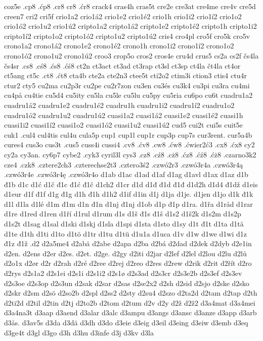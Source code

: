 coz5e
.cp8
.ćp8
.cr8
cr8
.ćr8
crack4
cras4h
cras5t
cre2e
cre3at
cre4me
cre4v
cre5d
creen7
cri2
cri5f
crio1a2
crio1á2
crio1e2
crio1é2
crio1h
crio1i2
crio1í2
crio1o2
crio1ó2
crio1u2
crio1ú2
cripto1a2
cripto1á2
cripto1e2
cripto1é2
cripto1h
cripto1i2
cripto1í2
cripto1o2
cripto1ó2
cripto1u2
cripto1ú2
cris4
cro4pl
cro5f
cro5k
cro5v
crono1a2
crono1á2
crono1e2
crono1é2
crono1h
crono1i2
crono1í2
crono1o2
crono1ó2
crono1u2
crono1ú2
croo3
crop5o
cros2
cros4e
cru4d
crus5
cs2a
cs2f
čs4la
čs4sr
.cs8
.cś8
.ćs8
.ćś8
ct2n
ct3act
ct3ad
ct3rap
ct3sl
ct3sp
ct4la
čt4la
ct4or
ct5ang
ct5c
.ct8
.ćt8
cta4b
cte2a
cte2n3
ctee5t
cti2o2
ctim3i
ction3
ctis4
ctu4r
ctur2
cty5
cu2ma
cu2p3r
cu2pe
cu2r7zon
cu3en
cu3és
cu3k4
cu3pi
cu3ra
cu4mi
cu4på
cu4tie
cu5d4
cu5ity
cu5la
cu5le
cu5lu
cu5py
cu5ria
cu6po
cu6t
cuadru1a2
cuadru1á2
cuadru1e2
cuadru1é2
cuadru1h
cuadru1i2
cuadru1í2
cuadru1o2
cuadru1ó2
cuadru1u2
cuadru1ú2
cuasi1a2
cuasi1á2
cuasi1e2
cuasi1é2
cuasi1h
cuasi1i2
cuasi1í2
cuasi1o2
cuasi1ó2
cuasi1u2
cuasi1ú2
cud5
cui2t
cui5s
cuit5e
cuk1
.cul4
cul4tis
cul4u
cula5p
cup1
cup1l
cup1r
cup3p
cup7s
cur3rent.
cur5a4b
cures4
cus3o
cus3t
.cus5
cuss4i
cussi4
.cv8
.ćv8
.cw8
.ćw8
.ćwier2ć3
.cx8
.ćx8
cy2
cy2a
cy3an.
cy6p7
cybe2
.cyk3
cyril3l
cys3
.cz8
.cź8
.cż8
.ćz8
.ćź8
.ćż8
.czarno3k2
cze4
.czk8
.cztere2ch3
.czterechse2t3
.cztero3ś2
.czwó2r3
.czwó3r4a
.czwó3r4ą
.czwó3r4e
.czwó3r4ę
.czwó3r4o
d1ab
d1ac
d1ad
d1af
d1ag
d1avl
d1ax
d1az
d1b
đ1b
d1c
d1ć
d1č
đ1c
đ1ć
đ1č
d1ch2
d1cr
d1d
d1đ
đ1d
đ1đ
d1d2h
d1d4
đ1dž
d1eis
d1eur
d1f
đ1f
d1g
đ1g
d1h
đ1h
d1h2
d1if
d1in
d1j
d1ja
d1je.
d1jen
d1jo
d1k
đ1k
d1l
d1la
d1lé
d1m
đ1m
d1n
đ1n
d1nj
đ1nj
d1ob
d1p
đ1p
d1ra.
d1řa
d1råd
d1rar
d1re
d1red
d1ren
d1ří
d1rul
d1rum
d1s
d1š
đ1s
đ1š
d1s2
d1š2k
d1s2m
d1s2p
d1s2t
d1sag
d1sal
d1ski
d1skj
d1sla
d1spi
d1sta
d1sto
d1sy
d1t
đ1t
d1ta
d1tä
d1te
d1th
d1ti
d1to
d1tö
d1tr
d1tu
d1tü
d1u1a
d1uca
d1v
d1w
d1we
d1wi
d1z
đ1z
đ1ž
.d2
d2a5me4
d2abä
d2abe
d2apa
d2ba
d2bá
d2dad
d2dek
d2dyb
d2e1in
d2en.
d2ens
d2er
d2es.
d2et.
d2ge.
d2gy
d2iti
d2jar
d2lef
d2lel
d2lou
d2lu
d2lů
d2o1x
d2ør
d2r
d2rah
d2ré
d2ree
d2rej
d2reo
d2res
d2rew
d2rik
d2rit
d2řít
d2ro
d2rys
d2s1a2
d2s1ei
d2s1i
d2s1i2
d2s1ø
d2s3ad
d2s3cr
d2s3e2b
d2s3ef
d2s3ev
d2s3oe
d2s3op
d2s3un
d2sak
d2sar
d2sas
d2se2x2
d2sh
d2sid
d2sjo
d2ske
d2sko
d2skr
d2sm
d2sö
d2so2b
d2spl
d2ss2
d2sty
d2su4
d2szo
d2ta2d
d2tam
d2tap
d2th
d2ti2d
d2til
d2tin
d2tj
d2to2b
d2tom
d2tum
d2v
d2y
d2ž
d2ž2
d3a4mat
d3a4mei
d3a4na3t
d3aap
d3aend
d3alar
d3alc
d3ampu
d3angs
d3ansc
d3anze
d3app
d3arb
d3ås.
d3av5s
d3da
d3dä
d3dh
d3do
d3eie
d3eig
d3eil
d3eing
d3eiw
d3emb
d3eq
d3ge4t
d3gl
d3go
d3h
d3hu
d3infe
d3j
d3kv
d3la
